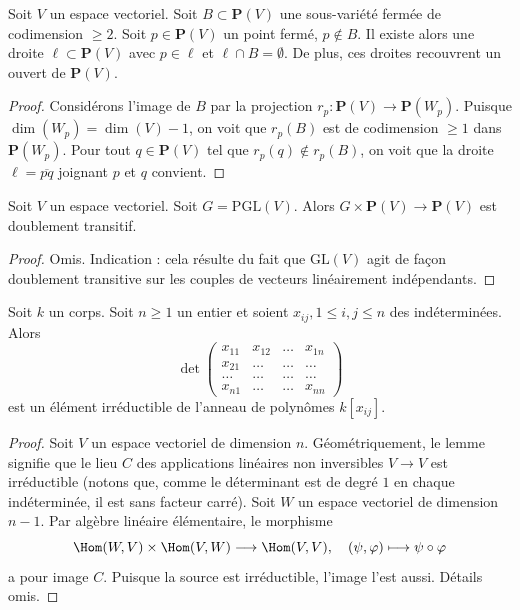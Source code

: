 \begin{lemma}
\label{lemma-find-lines}
Soit $V$ un espace vectoriel. Soit $B \subset \mathbf{P}(V)$
une sous-variété fermée de codimension $\geq 2$.
Soit $p \in \mathbf{P}(V)$ un point fermé, $p \not \in B$.
Il existe alors une droite $\ell \subset \mathbf{P}(V)$
avec $p \in \ell$ et $\ell \cap B = \emptyset$. De plus, ces droites
recouvrent un ouvert de $\mathbf{P}(V)$.
\end{lemma}

\begin{proof}
Considérons l'image de $B$ par la projection
$r_p : \mathbf{P}(V) \to \mathbf{P}(W_p)$.
Puisque $\dim(W_p) = \dim(V) - 1$, on voit que $r_p(B)$
est de codimension $\geq 1$ dans $\mathbf{P}(W_p)$.
Pour tout $q \in \mathbf{P}(V)$ tel que $r_p(q) \not \in r_p(B)$,
on voit que la droite $\ell = \overline{pq}$ joignant $p$ et $q$ convient.
\end{proof}

\begin{lemma}
\label{lemma-doubly-transitive}
Soit $V$ un espace vectoriel. Soit $G = \text{PGL}(V)$.
Alors $G \times \mathbf{P}(V) \to \mathbf{P}(V)$ est
doublement transitif.
\end{lemma}

\begin{proof}
Omis. Indication : cela résulte du fait que $\text{GL}(V)$ agit de façon
doublement transitive sur les couples de vecteurs linéairement indépendants.
\end{proof}

\begin{lemma}
\label{lemma-determinant}
Soit $k$ un corps. Soit $n \geq 1$ un entier et soient
$x_{ij}, 1 \leq i, j \leq n$ des indéterminées. Alors
$$
\det
\left(
\begin{matrix}
x_{11} & x_{12} & \ldots & x_{1n} \\
x_{21} & \ldots & \ldots & \ldots \\
\ldots & \ldots & \ldots & \ldots \\
x_{n1} & \ldots & \ldots & x_{nn}
\end{matrix}
\right)
$$
est un élément irréductible de l'anneau de polynômes $k[x_{ij}]$.
\end{lemma}

\begin{proof}
Soit $V$ un espace vectoriel de dimension $n$. Géométriquement,
le lemme signifie que le lieu $C$ des applications linéaires non inversibles
$V \to V$ est irréductible (notons que, comme le déterminant est de degré
$1$ en chaque indéterminée, il est sans facteur carré). Soit $W$ un espace vectoriel de
dimension $n - 1$. Par algèbre linéaire élémentaire, le morphisme
$$
\Hom(W, V) \times \Hom(V, W) \longrightarrow \Hom(V, V),\quad
(\psi, \varphi) \longmapsto \psi \circ \varphi
$$
a pour image $C$. Puisque la source est irréductible, l'image l'est aussi.
Détails omis.
\end{proof}

